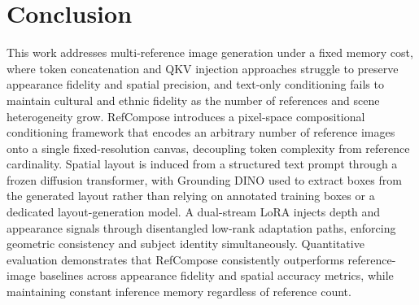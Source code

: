 \documentclass[runningheads]{llncs}
\begin{document}
\section{Conclusion}

This work addresses multi-reference image generation under a fixed memory cost, 
where token concatenation and QKV injection approaches struggle to preserve 
appearance fidelity and spatial precision, and text-only conditioning fails to 
maintain cultural and ethnic fidelity as the number of references and scene 
heterogeneity grow. RefCompose introduces a pixel-space compositional conditioning 
framework that encodes an arbitrary number of reference images onto a single 
fixed-resolution canvas, decoupling token complexity from reference cardinality. 
Spatial layout is induced from a structured text prompt through a frozen diffusion 
transformer, with Grounding DINO used to extract boxes from the generated layout 
rather than relying on annotated training boxes or a dedicated layout-generation 
model. A dual-stream LoRA injects depth and appearance signals through disentangled 
low-rank adaptation paths, enforcing geometric consistency and subject identity 
simultaneously. Quantitative evaluation demonstrates that RefCompose consistently 
outperforms reference-image baselines across appearance fidelity and spatial accuracy 
metrics, while maintaining constant inference memory regardless of reference count.
\end{document}
